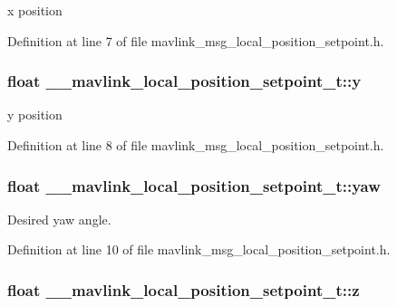 x position 



Definition at line 7 of file mavlink\-\_\-msg\-\_\-local\-\_\-position\-\_\-setpoint.\-h.

\hypertarget{struct____mavlink__local__position__setpoint__t_a99c553607e40da3cefd2d4221731c382}{
\subsubsection[{y}]{\setlength{\rightskip}{0pt plus 5cm}float \-\_\-\-\_\-mavlink\-\_\-local\-\_\-position\-\_\-setpoint\-\_\-t\-::y}}\label{struct____mavlink__local__position__setpoint__t_a99c553607e40da3cefd2d4221731c382}


y position 



Definition at line 8 of file mavlink\-\_\-msg\-\_\-local\-\_\-position\-\_\-setpoint.\-h.

\hypertarget{struct____mavlink__local__position__setpoint__t_a5fc83cf34d1de6841554d7413a9b3a86}{
\subsubsection[{yaw}]{\setlength{\rightskip}{0pt plus 5cm}float \-\_\-\-\_\-mavlink\-\_\-local\-\_\-position\-\_\-setpoint\-\_\-t\-::yaw}}\label{struct____mavlink__local__position__setpoint__t_a5fc83cf34d1de6841554d7413a9b3a86}


Desired yaw angle. 



Definition at line 10 of file mavlink\-\_\-msg\-\_\-local\-\_\-position\-\_\-setpoint.\-h.

\hypertarget{struct____mavlink__local__position__setpoint__t_a3b95008f9ca33b3b1f0f23086dda34f2}{
\subsubsection[{z}]{\setlength{\rightskip}{0pt plus 5cm}float \-\_\-\-\_\-mavlink\-\_\-local\-\_\-position\-\_\-setpoint\-\_\-t\-::z}}\label{struct____mavlink__local__position__setpoint__t_a3b95008f9ca33b3b1f0f23086dda34f2}


